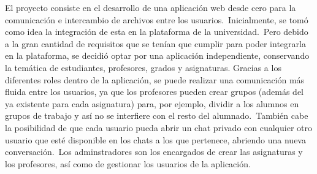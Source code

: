 

El proyecto consiste en el desarrollo de una aplicación web desde cero para la comunicación e intercambio de archivos
entre los usuarios.\ Inicialmente, se tomó como idea la integración de esta en la plataforma de la universidad.\ Pero
debido a la gran cantidad de requisitos que se tenían que cumplir para poder integrarla en la plataforma, se decidió
optar por una aplicación independiente, conservando la temática de estudiantes, profesores, grados y asignaturas.
Gracias a los diferentes roles dentro de la aplicación, se puede realizar una comunicación más fluida entre los
usuarios, ya que los profesores pueden crear grupos (además del ya existente para cada asignatura) para, por ejemplo,
dividir a los alumnos en grupos de trabajo y así no se interfiere con el resto del alumnado.\ También cabe la
posibilidad de que cada usuario pueda abrir un chat privado con cualquier otro usuario que esté disponible en los
chats a los que pertenece, abriendo una nueva conversación.\ Los adminstradores son los encargados de crear
las asignaturas y los profesores, así como de gestionar los usuarios de la aplicación.
